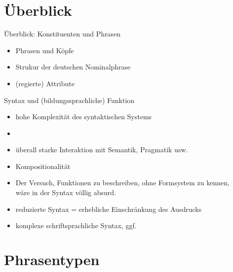 
\section{Überblick}

\begin{frame}
  {Überblick: Konstituenten und Phrasen}
  \pause
  \begin{itemize}[<+->]
    \item Phrasen und Köpfe
    \item Strukur der deutschen \alert{Nominalphrase}
    \item (regierte) Attribute
  \end{itemize}
\end{frame}

\begin{frame}
  {Syntax und (bildungssprachliche) Funktion}
  \pause
  \begin{itemize}[<+->]
    \item \alert{hohe Komplexität} des syntaktischen Systems
    \item {}
    \item überall \alert{starke Interaktion mit Semantik, Pragmatik usw.}
    \item \alert{Kompositionalität}
      \Zeile
    \item Der Versuch, Funktionen zu beschreiben, ohne Formsystem zu kennen,\\
      wäre in der Syntax völlig absurd.
      \Zeile
    \item reduzierte Syntax = erhebliche Einschränkung des Ausdrucks
    \item komplexe schriftsprachliche Syntax, ggf.\ 
  \end{itemize}
\end{frame}


\section{Phrasentypen}

